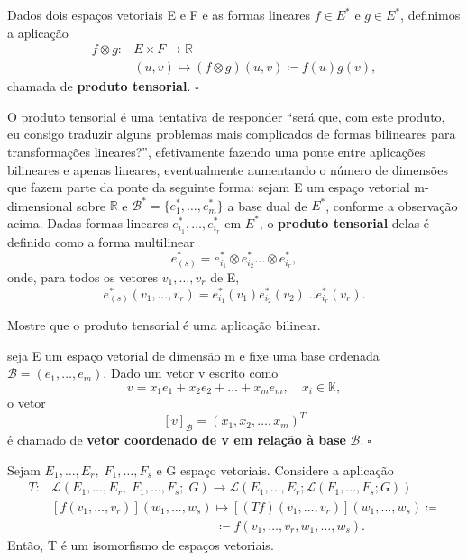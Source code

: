 \documentclass[../differential_forms.tex]{subfiles}
\begin{document}
\begin{def*}
	Dados dois espaços vetoriais E e F e as formas lineares \(f\in E^{*}\) e \(g\in E^{*}\), definimos a aplicação
	\begin{align*}
		f\otimes g: & E\times F\rightarrow\mathbb{R}                          \\
		            & (u, v)\longmapsto (f\otimes g)(u, v)\coloneqq f(u)g(v),
	\end{align*}
	chamada de \textbf{produto tensorial}. \(\square\)
\end{def*}
O produto tensorial é uma tentativa de responder ``será que, com este produto, eu consigo traduzir alguns problemas mais complicados de formas bilineares para transformações lineares?'', efetivamente fazendo uma ponte entre aplicações bilineares e apenas lineares, eventualmente aumentando o número de dimensões que fazem parte da ponte da seguinte forma: sejam E um espaço vetorial m-dimensional sobre \(\mathbb{R}\) e \(\mathcal{B}^{*} = \{e_{1}^{*}, \dotsc , e_{m}^{*}\}\) a base dual de \(E^{*}\), conforme a observação acima. Dadas formas lineares \(e_{i_1}^{*}, \dotsc , e_{i_r}^{*}\) em \(E^{*}\), o \textbf{produto tensorial} delas é definido como a forma multilinear
\[
	e_{(s)}^{*} = e_{i_1}^{*}\otimes e_{i_2}^{*}\dotsc \otimes e_{i_r}^{*},
\]
onde, para todos os vetores \(v_1, \dotsc ,v_r\) de E,
\[
	e_{(s)}^{*}(v_1, \dotsc , v_r) = e_{i_1}^{*}(v_1)e_{i_2}^{*}(v_2)\dotsc e_{i_r}^{*}(v_r).
\]
\begin{exr}
	Mostre que o produto tensorial é uma aplicação bilinear.

\end{exr}
\begin{def*}
	seja E um espaço vetorial de dimensão m e fixe uma base ordenada \(\mathcal{B} = (e_1, \dotsc , e_m)\). Dado um vetor v escrito como
	\[
		v = x_1e_1 + x_2e_2 + \dotsc + x_{m}e_{m},\quad x_{i}\in \mathbb{K},
	\]
	o vetor
	\[
		[v]_{\mathcal{B}} = (x_1, x_2, \dotsc , x_m)^{T}
	\]
	é chamado de \textbf{vetor coordenado de v em relação à base } \(\mathcal{B}.\; \square\)
\end{def*}
\begin{prop*}
	Sejam \(E_1, \dotsc , E_r,\; F_1,\dotsc , F_s\) e G espaço vetoriais. Considere a aplicação
	\begin{align*}
		T: & \mathcal{L}(E_1, \dotsc , E_r,\; F_1, \dotsc , F_s;\;G)\rightarrow \mathcal{L}(E_1, \dotsc , E_r; \mathcal{L}(F_1, \dotsc ,F_s; G)) \\
		   & [f(v_1, \dotsc , v_r)](w_1, \dotsc , w_s)\longmapsto [(Tf)(v_1,\dotsc ,v_r)](w_1,\dotsc ,w_s)\coloneqq                              \\
		   & \quad\quad \quad \quad \quad \quad \quad\quad \quad \quad \quad \quad \quad  \coloneqq f(v_1,\dotsc ,v_r,w_1,\dotsc ,w_s).
	\end{align*}
	Então, T é um isomorfismo de espaços vetoriais.
\end{prop*}
\end{document}
